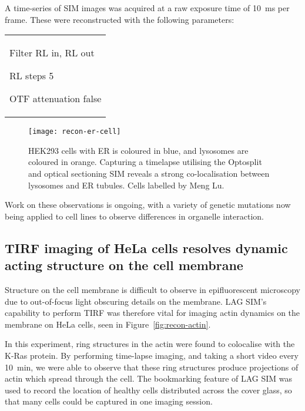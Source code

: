 A time-series of SIM images was acquired at a raw exposure time of \SI{10}{\milli\second} per frame. 
These were reconstructed with the following parameters: \newline
\begin{tabular}{p{}}
\begin{labelling}[margin=OTF attenuation]
	\item[Filter] RL in, RL out
	\item[RL steps] 5
	\item[OTF attenuation] false
\end{labelling}
\end{tabular}

\begin{figure}[tbp!]
\centering
\texttt{[image: recon-er-cell]}
\caption[LAG SIM: Fast, multi-colour imaging of ER in cells reveals co-localisation between lysosomes and ER tubules]{HEK293 cells with ER is coloured in blue, and lysosomes are coloured in orange. Capturing a timelapse utilising the Optosplit and optical sectioning SIM reveals a strong co-localisation between lysosomes and ER tubules. Cells labelled by Meng Lu. }
\label{fig:recon-er-cell}
\end{figure}

Work on these observations is ongoing, with a variety of genetic mutations now being applied to cell lines to observe differences in organelle interaction. 


\subsection{TIRF imaging of HeLa cells resolves dynamic acting structure on the cell membrane}
Structure on the cell membrane is difficult to observe in epifluorescent microscopy due to out-of-focus light obscuring details on the membrane. 
LAG SIM's capability to perform TIRF was therefore vital for imaging actin dynamics on the membrane on HeLa cells, seen in Figure~\ref{fig:recon-actin}. 

In this experiment, ring structures in the actin were found to colocalise with the K-Ras protein. 
By performing time-lapse imaging, and taking a short video every \SI{10}{\minute}, we were able to observe that these ring structures produce projections of actin which spread through the cell. 
The bookmarking feature of LAG SIM was used to record the location of healthy cells distributed across the cover glass, so that many cells could be captured in one imaging session. 

